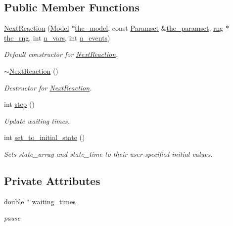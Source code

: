 \subsection*{Public Member Functions}
\begin{DoxyCompactItemize}
\item 
\hyperlink{class_next_reaction_ac08695146983c863c3edf3bb4e61d9f9}{Next\+Reaction} (\hyperlink{class_model}{Model} $\ast$\hyperlink{class_realization_a47ec1d062b8caee874b08c1a17d6aeeb}{the\+\_\+model}, const \hyperlink{class_paramset}{Paramset} \&\hyperlink{class_realization_a119bb29de88929bc51bc1b329473a94b}{the\+\_\+paramset}, \hyperlink{classrng}{rng} $\ast$\hyperlink{class_realization_ac8d358d929afae90cf5790675b6744f9}{the\+\_\+rng}, int \hyperlink{class_realization_ad9951a0829e68e12fcb3817735bb5097}{n\+\_\+vars}, int \hyperlink{class_realization_afb711282bef806fc0020f91252d1df2c}{n\+\_\+events})
\begin{DoxyCompactList}\small\item\em Default constructor for \hyperlink{class_next_reaction}{Next\+Reaction}. \end{DoxyCompactList}\item 
\hyperlink{class_next_reaction_aceb23c3b2e23c811809ef04197a39e8d}{$\sim$\+Next\+Reaction} ()
\begin{DoxyCompactList}\small\item\em Destructor for \hyperlink{class_next_reaction}{Next\+Reaction}. \end{DoxyCompactList}\item 
int \hyperlink{class_next_reaction_a2c1502879c76efe398c2947056936725}{step} ()
\begin{DoxyCompactList}\small\item\em Update waiting times. \end{DoxyCompactList}\item 
int \hyperlink{class_next_reaction_a0cc63c4ec9fe3f338472fff302f6d746}{set\+\_\+to\+\_\+initial\+\_\+state} ()
\begin{DoxyCompactList}\small\item\em Sets state\+\_\+array and state\+\_\+time to their user-\/specified initial values. \end{DoxyCompactList}\end{DoxyCompactItemize}
\subsection*{Private Attributes}
\begin{DoxyCompactItemize}
\item 
\mbox{\label{class_next_reaction_a8a7d82a004db70828dd732bf57cf35b6}} 
double $\ast$ \hyperlink{class_next_reaction_a8a7d82a004db70828dd732bf57cf35b6}{waiting\+\_\+times}
\begin{DoxyCompactList}\small\item\em pause \end{DoxyCompactList}\end{DoxyCompactItemize}

